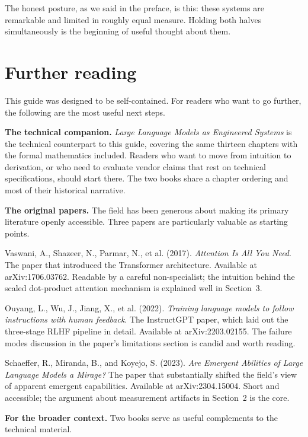 The honest posture, as we said in the preface, is this:
these systems are remarkable and limited in roughly equal
measure. Holding both halves simultaneously is the
beginning of useful thought about them.

\section*{Further reading}

This guide was designed to be self-contained. For readers
who want to go further, the following are the most useful
next steps.

\medskip
\noindent\textbf{The technical companion.} \emph{Large
Language Models as Engineered Systems} is the technical
counterpart to this guide, covering the same thirteen
chapters with the formal mathematics included. Readers
who want to move from intuition to derivation, or who need
to evaluate vendor claims that rest on technical
specifications, should start there. The two books share
a chapter ordering and most of their historical narrative.

\medskip
\noindent\textbf{The original papers.} The field has been
generous about making its primary literature openly
accessible. Three papers are particularly valuable as
starting points.

Vaswani, A., Shazeer, N., Parmar, N., et al. (2017).
\emph{Attention Is All You Need}. The paper that introduced
the Transformer architecture. Available at arXiv:1706.03762.
Readable by a careful non-specialist; the intuition behind
the scaled dot-product attention mechanism is explained
well in Section~3.

Ouyang, L., Wu, J., Jiang, X., et al. (2022).
\emph{Training language models to follow instructions
with human feedback}. The InstructGPT paper, which laid
out the three-stage RLHF pipeline in detail. Available
at arXiv:2203.02155. The failure modes discussion in
the paper's limitations section is candid and worth reading.

Schaeffer, R., Miranda, B., and Koyejo, S. (2023).
\emph{Are Emergent Abilities of Large Language Models
a Mirage?} The paper that substantially shifted the
field's view of apparent emergent capabilities. Available
at arXiv:2304.15004. Short and accessible; the argument
about measurement artifacts in Section~2 is the core.

\medskip
\noindent\textbf{For the broader context.} Two books
serve as useful complements to the technical material.

